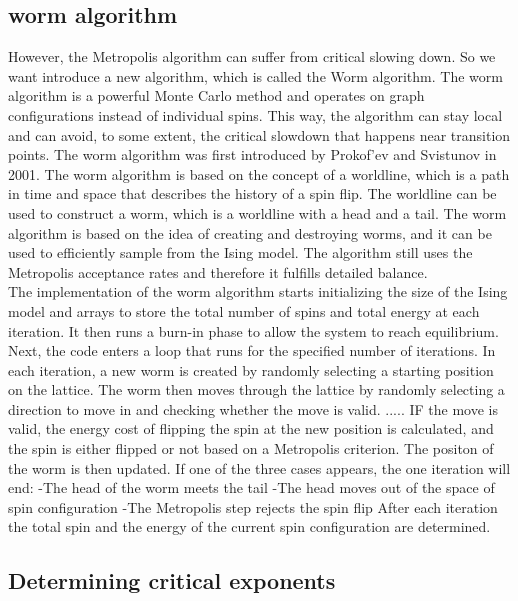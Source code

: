 \documentclass[%
reprint,
 amsmath,amssymb,
 aps,
]{revtex4-2}
\begin{document}
\subsection{worm algorithm}
However, the Metropolis algorithm can suffer from critical slowing down. So we want introduce a new algorithm, which is called the Worm algorithm. The worm algorithm is a powerful Monte Carlo method and operates on graph configurations instead of individual spins. This way, the algorithm can stay local and can avoid, to some extent, the critical slowdown that happens near transition points.
The worm algorithm was first introduced by Prokof'ev and Svistunov in 2001. The worm algorithm is based on the concept of a worldline, which is a path in time and space that describes the history of a spin flip. The worldline can be used to construct a worm, which is a worldline with a head and a tail. The worm algorithm is based on the idea of creating and destroying worms, and it can be used to efficiently sample from the Ising model.
The algorithm still uses the Metropolis acceptance rates and therefore it fulfills detailed balance. \\
The implementation of the worm algorithm starts initializing the size of the Ising model and arrays to store the total number of spins and total energy at each iteration. It then runs a burn-in phase to allow the system to reach equilibrium. \\
Next, the code enters a loop that runs for the specified number of iterations. In each iteration, a new worm is created by randomly selecting a starting position on the lattice. The worm then moves through the lattice by randomly selecting a direction to move in and checking whether the move is valid. 
.....
IF the move is valid, the energy cost of flipping the spin at the new position is calculated, and the spin is either flipped or not based on a Metropolis criterion. The positon of the worm is then updated. 
If one of the three cases appears, the one iteration will end: 
-The head of the worm meets the tail
-The head moves out of the space of spin configuration
-The Metropolis step rejects the spin flip
After each iteration the total spin and the energy of the current spin configuration are determined.  



\subsection{Determining critical exponents}
\end{document}
